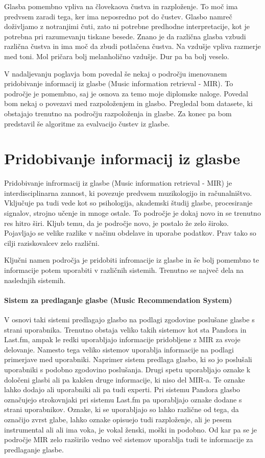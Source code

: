 \documentclass[a4paper, 12pt]{book}
\begin{document}
{Glasba pomembno vpliva na človekaova čustva in razploženje. To moč ima predvsem zaradi tega, ker ima neposredno pot do čustev. Glasbo namreč doživljamo z notranjimi čuti, zato ni potrebne predhodne interpretacije, kot je potrebna pri razumevanju tiskane besede.  Znano je da različna glasba vzbudi različna čustva in ima moč da zbudi potlačena čustva. Na vzdušje vpliva razmerje med toni. Mol pričara bolj melanholično vzdušje. Dur pa ba bolj veselo. \cite{lenko2009pomen}

V nadaljevanju poglavja bom povedal še nekaj o področju imenovanem pridobivanje informacij iz glasbe (Music information retrieval - MIR). To področje je pomembno, saj je osnova za temo moje diplomske naloge. Povedal bom nekaj o povezavi med razpoloženjem in glasbo. Pregledal bom datasete, ki obstajajo trenutno na področju razpoloženja in glasbe. Za konec pa bom predstavil še algoritme za evalvacijo čustev iz glasbe. 

\section{Pridobivanje informacij iz glasbe}

Pridobivanje infrormacij iz glasbe (Music information retrieval - MIR) je interdisciplinarna zannost, ki povezuje predvsem muzikologijo in računalništvo. \cite{pesek2012prepoznavanje} Vključuje pa tudi vede kot so psihologija, akademski študij glasbe, procesiranje signalov, strojno učenje in mnoge ostale. To področje je dokaj novo in se trenutno res hitro širi. Kljub temu, da je področje novo, je postalo že zelo široko. Pojavljajo se velike razlike v načinu obdelave in uporabe podatkov. Prav tako so cilji raziskovalcev zelo različni.

Ključni namen področja je pridobiti infromacije iz glasbe in še bolj pomembno te informacije potem uporabiti v različnih sistemih. Trenutno se največ dela na naslednjih sistemih. 

\paragraph{Sistem za predlaganje glasbe (Music Recommendation System)}

V osnovi taki sistemi predlagajo glasbo na podlagi zgodovine poslušane glasbe s strani uporabnika. Trenutno obstaja veliko takih sistemov kot sta Pandora in Last.fm, ampak le redki uporabljajo informacije pridobljene z MIR za svoje delovanje. Namesto tega veliko sistemov uporablja informacije na podlagi primerjave med uporabniki. Naprimer sistem predlaga glasbo, ki so jo poslušali uporabniki s podobno zgodovino poslušanja. Drugi spetu uporabljajo oznake k določeni glasbi ali pa kakšen druge informacije, ki niso del MIR-a. Te oznake lahko dodajo ali uporabniki ali pa tudi experti. Pri sistemu Pandora glasbo označujejo strokovnjaki pri sistemu Last.fm pa uporabljajo oznake dodane s strani uporabnikov. Oznake, ki se uporabljajo so lahko različne od tega, da označijo zvrst glabe, lahko oznake opisuejo tudi razploženje, ali je pesem instrumental ali ali ima voka, je vokal ženski, moški in podobno. Od kar pa se je področje MIR zelo razširilo vedno več sistemov uporablja tudi te informacije za predlaganje glasbe. 
 
}
\end{document}
